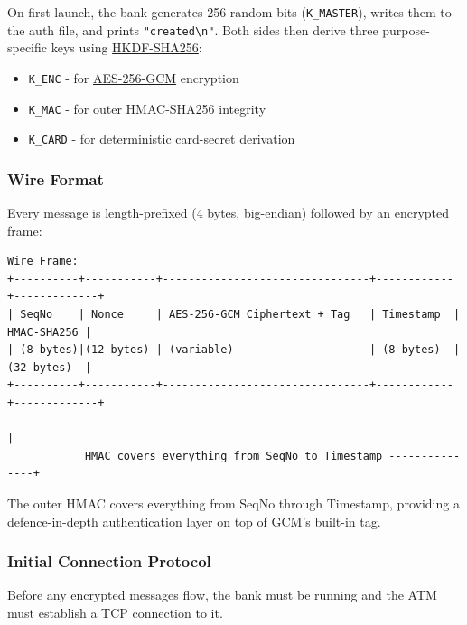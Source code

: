 \documentclass[
]{article}
\providecommand{\tightlist}{%
  \setlength{\itemsep}{0pt}\setlength{\parskip}{0pt}}
\begin{document}
On first launch, the bank generates 256 random bits
(\texttt{K\_MASTER}), writes them to the auth file, and prints
\texttt{"created\textbackslash{}n"}. Both sides then derive three
purpose-specific keys using
\href{https://datatracker.ietf.org/doc/html/rfc5869}{HKDF-SHA256}:

\begin{itemize}
\tightlist
\item
  \texttt{K\_ENC} - for
  \href{https://en.wikipedia.org/wiki/Galois/Counter_Mode}{AES-256-GCM}
  encryption
\item
  \texttt{K\_MAC} - for outer HMAC-SHA256 integrity
\item
  \texttt{K\_CARD} - for deterministic card-secret derivation
\end{itemize}

\hypertarget{wire-format}{%
\subsubsection{Wire Format}\label{wire-format}}

Every message is length-prefixed (4 bytes, big-endian) followed by an
encrypted frame:

\begin{verbatim}
Wire Frame:
+----------+-----------+--------------------------------+------------+-------------+
| SeqNo    | Nonce     | AES-256-GCM Ciphertext + Tag   | Timestamp  | HMAC-SHA256 |
| (8 bytes)|(12 bytes) | (variable)                     | (8 bytes)  | (32 bytes)  |
+----------+-----------+--------------------------------+------------+-------------+
                                                                          |
            HMAC covers everything from SeqNo to Timestamp ---------------+
\end{verbatim}

The outer HMAC covers everything from SeqNo through Timestamp, providing
a defence-in-depth authentication layer on top of GCM's built-in tag.

\hypertarget{initial-connection-protocol}{%
\subsubsection{Initial Connection
Protocol}\label{initial-connection-protocol}}

Before any encrypted messages flow, the bank must be running and the ATM
must establish a TCP connection to it.
\end{document}
